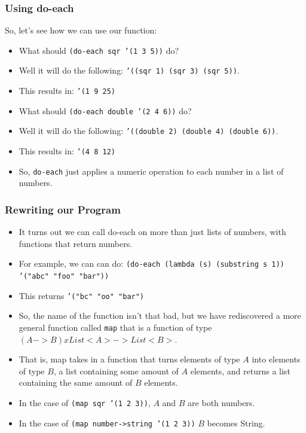 \documentclass{beamer}
\begin{document}
\begin{frame}
  \frametitle{Using do-each}
  So, let's see how we can use our function:
  \begin{itemize}
  \item<2-> What should \texttt{(do-each sqr '(1 3 5))} do?
  \item<3-> Well it will do the following: \texttt{'((sqr 1) (sqr 3) (sqr 5))}.
  \item<4-> This results in: \texttt{'(1 9 25)}
  \item<5-> What should \texttt{(do-each double '(2 4 6))} do?
  \item<6-> Well it will do the following: \texttt{'((double 2) (double 4) (double 6))}.
  \item<7-> This results in: \texttt{'(4 8 12)}
  \item<8-> So, \texttt{do-each} just applies a numeric operation
    to each number in a list of numbers.
  \end{itemize}
\end{frame}

\begin{frame}
  \frametitle{Rewriting our Program}
  \begin{itemize}
  \item<2-> It turns out we can call do-each on more than just lists of numbers, with
    functions that return numbers.
  \item<3-> For example, we can can do: \texttt{(do-each (lambda (s) (substring s 1)) '("abc" "foo" "bar"))}
  \item<4-> This returns \texttt{'("bc" "oo" "bar")}
  \item<5-> So, the name of the function isn't that bad, but we have rediscovered a more general function
    called \texttt{map} that is a function of type $(A -> B) x List<A> -> List<B>$.
  \item<6-> That is, map takes in a function that turns elements of type $A$ into elements of type $B$, a list containing
    some amount of $A$ elements, and returns a list containing the same amount of $B$ elements.
  \item<7-> In the case of \texttt{(map sqr '(1 2 3))}, $A$ and $B$ are both numbers.
  \item<8-> In the case of \texttt{(map number->string '(1 2 3))} $B$ becomes String.
  \end{itemize}
\end{frame}
\end{document}
